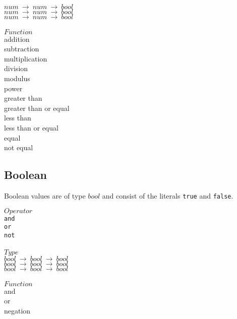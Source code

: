 ﻿\documentclass[5pt]{article}
\begin{document}
\begin{multicols}{3}
$num \ \rightarrow \ num \ \rightarrow \ bool $ \\
$num \ \rightarrow \ num \ \rightarrow \ bool $ \\
$num \ \rightarrow \ num \ \rightarrow \ bool $ \\
\columnbreak \\
$Function$ \\
addition \\
subtraction \\
multiplication \\
division \\
modulus \\
power \\
greater than \\
greater than or equal \\
less than \\
less than or equal \\
equal \\
not equal \\
\end{multicols}
\subsection{Boolean}
Boolean values are of type $bool$ and consist of the literals \texttt{true} and \texttt{false}. 
\begin{multicols}{3}
\noindent $Operator$ \\
\hspace*{5mm} \texttt{and} \\
\hspace*{5mm} \texttt{or} \\
\hspace*{5mm} \texttt{not} \\
\columnbreak \\
\noindent $Type$ \\
$bool \ \rightarrow \ bool \ \rightarrow \ bool $ \\
$bool \ \rightarrow \ bool \ \rightarrow \ bool $ \\
$bool \ \rightarrow \ bool \ \rightarrow \ bool $ \\
\columnbreak \\
\noindent $Function$ \\
and \\
or \\
negation \\
\end{multicols}
\end{document}
